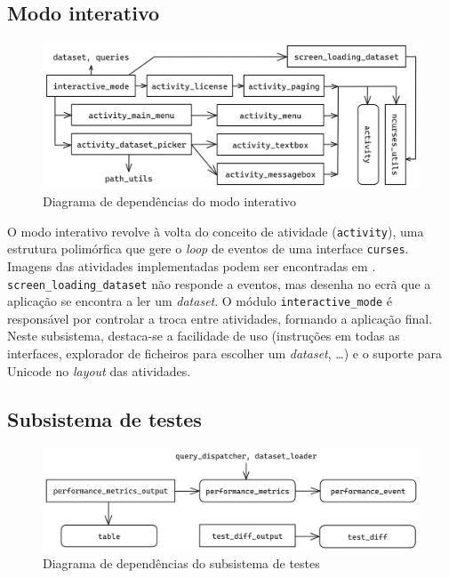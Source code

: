 \documentclass[11pt, a4paper]{article}
\begin{document}
\subsection{Modo interativo}
\label{sec:interactive-mode}

\begin{figure}[H]
    \centering
    \includegraphics[scale=0.16]{res-fase2/interactive.png}
    \caption{Diagrama de dependências do modo interativo}
    \label{fig:interactive}
\end{figure}

O modo interativo revolve à volta do conceito de atividade (\texttt{activity}), uma estrutura
polimórfica que gere o \emph{loop} de eventos de uma interface \texttt{curses}. Imagens das
atividades implementadas podem ser encontradas em .
\texttt{screen\_loading\_dataset} não responde a eventos, mas desenha no ecrã que a aplicação se
encontra a ler um \emph{dataset}. O módulo \texttt{interactive\_mode} é responsável por controlar a
troca entre atividades, formando a aplicação final. Neste subsistema, destaca-se a facilidade de
uso (instruções em todas as interfaces, explorador de ficheiros para escolher um \emph{dataset},
\dots) e o suporte para Unicode no \emph{layout} das atividades.

\subsection{Subsistema de testes}
\label{sec:testing-subsystem}

\begin{figure}[ht]
    \centering
    \includegraphics[scale=0.15]{res-fase2/testing.png}
    \caption{Diagrama de dependências do subsistema de testes}
    \label{fig:testing}
\end{figure}
\end{document}
